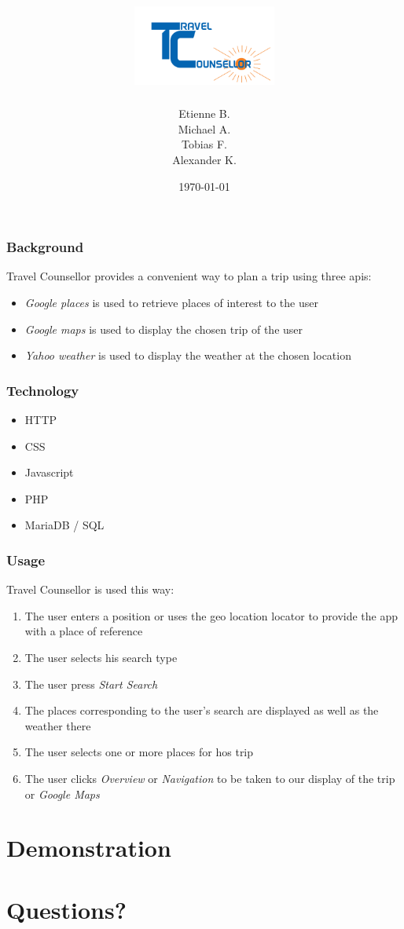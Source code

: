 \documentclass{beamer}
\title{\hspace{60px}\includegraphics[height=100px]{resources/logo.png}}
\institute{University of Innsbruck}
\date{\today}
\institute{Innsbruck University}
\author[Etienne Bertin]{Etienne B. \\ Michael A.\\ Tobias F.\\ Alexander K.}
\begin{document}
\begin{frame}
	\titlepage
\end{frame}


\begin{frame}
	\frametitle{Background}
	Travel Counsellor provides a convenient way to plan a trip using three apis:
	\begin{itemize}
		\item \textit{Google places} is used to retrieve places of interest to the user
		\item \textit{Google maps} is used to display the chosen trip of the user
		\item \textit{Yahoo weather} is used to display the weather at the chosen location
	\end{itemize}
\end{frame}


\begin{frame}
	\frametitle{Technology}
	\begin{itemize}
		\item HTTP
		\item CSS
		\item Javascript
		\item PHP
		\item MariaDB / SQL
	\end{itemize}
\end{frame}


\begin{frame}
	\frametitle{Usage}
	Travel Counsellor is used this way:
	\begin{enumerate}
		\item The user enters a position or uses the geo location locator to provide the app with a place of reference
		\item The user selects his search type
		\item The user press \textit{Start Search}
		\item The places corresponding to the user's search are displayed as well as the weather there
		\item The user selects one or more places for hos trip
		\item The user clicks \textit{Overview} or \textit{Navigation} to be taken to our display of the trip or \textit{Google Maps}
	\end{enumerate}
\end{frame}


\section{Demonstration}
\section{Questions?}
\end{document}
